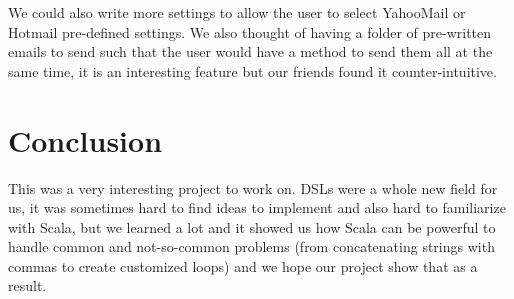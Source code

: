 \documentclass[a4paper, 11pt]{article}
\begin{document}
    We could also write more settings to allow the user to select YahooMail or
    Hotmail pre-defined settings. We also thought of having a folder of pre-written
    emails to send such that the user would have a method to send them all at
    the same time, it is an interesting feature but our friends found it
    counter-intuitive.

    \section{Conclusion}

    This was a very interesting project to work on. DSLs were a whole new
    field for us, it was sometimes hard to find ideas to implement and also
    hard to familiarize with Scala, but we learned a lot and it showed us how
    Scala can be powerful to handle common and not-so-common problems (from
    concatenating strings with commas to create customized loops) and we hope
    our project show that as a result.
\end{document}
